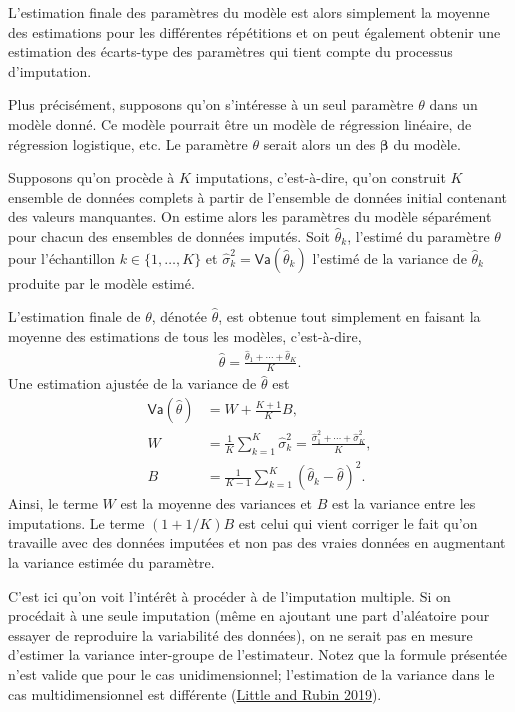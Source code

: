 \documentclass[
  11pt,
  letterpaper,
]{scrbook}
\theoremstyle{definition}
\theoremstyle{remark}
\begin{document}
L'estimation finale des paramètres du modèle est alors simplement la
moyenne des estimations pour les différentes répétitions et on peut
également obtenir une estimation des écarts-type des paramètres qui
tient compte du processus d'imputation.

Plus précisément, supposons qu'on s'intéresse à un seul paramètre
\(\theta\) dans un modèle donné. Ce modèle pourrait être un modèle de
régression linéaire, de régression logistique, etc. Le paramètre
\(\theta\) serait alors un des \(\boldsymbol{\beta}\) du modèle.

Supposons qu'on procède à \(K\) imputations, c'est-à-dire, qu'on
construit \(K\) ensemble de données complets à partir de l'ensemble de
données initial contenant des valeurs manquantes. On estime alors les
paramètres du modèle séparément pour chacun des ensembles de données
imputés. Soit \(\widehat{\theta}_k\), l'estimé du paramètre \(\theta\)
pour l'échantillon \(k \in \{1, \ldots, K\}\) et
\(\widehat{\sigma}_k^2=\mathsf{Va}(\widehat{\theta}_k)\) l'estimé de la
variance de \(\widehat{\theta}_k\) produite par le modèle estimé.

L'estimation finale de \(\theta\), dénotée \(\widehat{\theta}\), est
obtenue tout simplement en faisant la moyenne des estimations de tous
les modèles, c'est-à-dire, \begin{align*}
\widehat{\theta} = \frac{\widehat{\theta}_1 + \cdots + \widehat{\theta}_K}{K}.
\end{align*} Une estimation ajustée de la variance de
\(\widehat{\theta}\) est \begin{align*}
\mathsf{Va}(\hat{\theta}) &= W+ \frac{K+1}{K}B, 
\\ W &= \frac{1}{K} \sum_{k=1}^K \widehat{\sigma}^2_k = \frac{\widehat{\sigma}_1^2 + \cdots + \widehat{\sigma}_K^2}{K},\\
B &= \frac{1}{K-1} \sum_{k=1}^K (\widehat{\theta}_k - \widehat{\theta})^2.
\end{align*} Ainsi, le terme \(W\) est la moyenne des variances et \(B\)
est la variance entre les imputations. Le terme \((1+1/K)B\) est celui
qui vient corriger le fait qu'on travaille avec des données imputées et
non pas des vraies données en augmentant la variance estimée du
paramètre.

C'est ici qu'on voit l'intérêt à procéder à de l'imputation multiple. Si
on procédait à une seule imputation (même en ajoutant une part
d'aléatoire pour essayer de reproduire la variabilité des données), on
ne serait pas en mesure d'estimer la variance inter-groupe de
l'estimateur. Notez que la formule présentée n'est valide que pour le
cas unidimensionnel; l'estimation de la variance dans le cas
multidimensionnel est différente
(\protect\hyperlink{ref-Little.Rubin:2019}{Little and Rubin 2019}).
\end{document}

